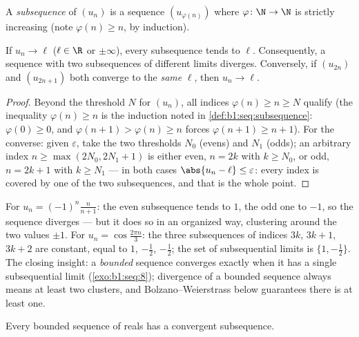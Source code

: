 \begin{definition}[Subsequence]\label{def:b1:seq:subsequence}
A \emph{subsequence} of $(u_n)$ is a sequence
$(u_{\varphi(n)})$ where $\varphi \colon \N \to \N$ is strictly
increasing (note $\varphi(n) \geq n$, by induction).
\end{definition}

\begin{proposition}\label{prop:b1:seq:subsequences}
If $u_n \to \ell$ ($\ell \in \R$ or $\pm\infty$), every subsequence
tends to $\ell$. Consequently, a sequence with two subsequences of
different limits diverges. Conversely, if $(u_{2n})$ and
$(u_{2n+1})$ both converge to the \emph{same} $\ell$, then $u_n \to
\ell$.
\end{proposition}

\begin{proof}
Beyond the threshold $N$ for $(u_n)$, all indices $\varphi(n) \geq n
\geq N$ qualify (the inequality $\varphi(n) \geq n$ is the
induction noted in \cref{def:b1:seq:subsequence}: $\varphi(0)
\geq 0$, and $\varphi(n+1) > \varphi(n) \geq n$ forces
$\varphi(n+1) \geq n + 1$). For the converse: given
$\varepsilon$, take the two thresholds $N_0$ (evens) and $N_1$
(odds); an arbitrary index $n \geq \max(2N_0, 2N_1 + 1)$ is
either even, $n = 2k$ with $k \geq N_0$, or odd, $n = 2k+1$ with
$k \geq N_1$ --- in both cases $\abs{u_n - \ell} \leq
\varepsilon$: every index is covered by one of the two
subsequences, and that is the whole point.
\end{proof}

\begin{example}\label{ex:b1:seq:sublimits}
For $u_n = (-1)^n \frac{n}{n+1}$: the even subsequence tends to
$1$, the odd one to $-1$, so the sequence diverges --- but it does
so in an organized way, clustering around the two values $\pm 1$.
For $u_n = \cos\frac{2\pi n}{3}$: the three subsequences of
indices $3k$, $3k + 1$, $3k + 2$ are constant, equal to $1$,
$-\frac12$, $-\frac12$; the set of subsequential limits is $\{1,
-\frac12\}$. The closing insight: a \emph{bounded} sequence
converges exactly when it has a single subsequential limit
(\cref{exo:b1:seq:8}); divergence of a bounded sequence always
means at least two clusters, and Bolzano--Weierstrass below
guarantees there is at least one.
\end{example}

\begin{theorem}\label{thm:b1:seq:bw}
Every bounded sequence of reals has a convergent
subsequence.
\end{theorem}

